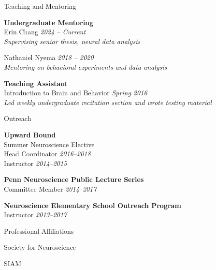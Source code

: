 \documentclass{resume} %
\begin{document}
\begin{rSection}{Teaching and Mentoring}

\textbf{Undergraduate Mentoring} \\
Erin Chang \hfill \emph{2024 -- Current} \\
\emph{Supervising senior thesis, neural data analysis}

Nathaniel Nyema \hfill \emph{2018 -- 2020} \\
\emph{Mentoring on behavioral experiments and data analysis}

\textbf{Teaching Assistant} \\
Introduction to Brain and Behavior \hfill \emph{Spring 2016} \\
\emph{Led weekly undergraduate recitation section and wrote testing material}

\end{rSection}


\begin{rSection}{Outreach}

\textbf{Upward Bound}\\
Summer Neuroscience Elective \\
Head Coordinator \hfill \emph{2016--2018} \\
Instructor \hfill \emph{2014--2015}

\textbf{Penn Neuroscience Public Lecture Series}\\
Committee Member \hfill \emph{2014--2017}

\textbf{Neuroscience Elementary School Outreach Program}\\
Instructor \hfill \emph{2013--2017}

\end{rSection}


\begin{rSection}{Professional Affiliations}

Society for Neuroscience

SIAM

\end{rSection}
\end{document}
